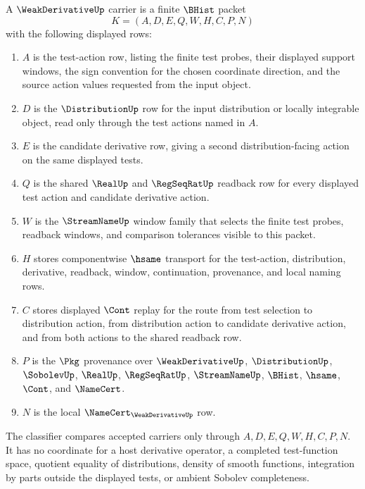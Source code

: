 \begin{definition}
\label{def:weak-derivative-carrier}
A $\WeakDerivativeUp$ carrier is a finite $\BHist$ packet
$$
K=(A,D,E,Q,W,H,C,P,N)
$$
with the following displayed rows:
\begin{enumerate}
\item $A$ is the test-action row, listing the finite test probes, their displayed support windows, the sign convention for the chosen coordinate direction, and the source action values requested from the input object.
\item $D$ is the $\DistributionUp$ row for the input distribution or locally integrable object, read only through the test actions named in $A$.
\item $E$ is the candidate derivative row, giving a second distribution-facing action on the same displayed tests.
\item $Q$ is the shared $\RealUp$ and $\RegSeqRatUp$ readback row for every displayed test action and candidate derivative action.
\item $W$ is the $\StreamNameUp$ window family that selects the finite test probes, readback windows, and comparison tolerances visible to this packet.
\item $H$ stores componentwise $\hsame$ transport for the test-action, distribution, derivative, readback, window, continuation, provenance, and local naming rows.
\item $C$ stores displayed $\Cont$ replay for the route from test selection to distribution action, from distribution action to candidate derivative action, and from both actions to the shared readback row.
\item $P$ is the $\Pkg$ provenance over $\WeakDerivativeUp$, $\DistributionUp$, $\SobolevUp$, $\RealUp$, $\RegSeqRatUp$, $\StreamNameUp$, $\BHist$, $\hsame$, $\Cont$, and $\NameCert$.
\item $N$ is the local $\NameCert_{\WeakDerivativeUp}$ row.
\end{enumerate}
The classifier compares accepted carriers only through $A,D,E,Q,W,H,C,P,N$. It has no coordinate for a host derivative operator, a completed test-function space, quotient equality of distributions, density of smooth functions, integration by parts outside the displayed tests, or ambient Sobolev completeness.
\end{definition}


